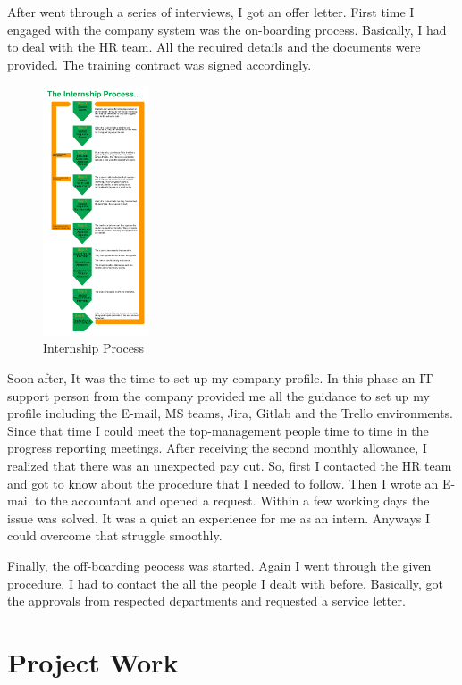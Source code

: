 \documentclass[twoside,12pt,times,onecolumn,a4paper]{report}
\begin{document}
\hspace{3em} After went through a series of interviews, I got an offer letter. First time I engaged with the company system was the on-boarding process. Basically, I had to deal with the HR team. All the required details and the documents were provided. The training contract was signed accordingly.

\begin{figure}
    \centering
    \includegraphics[width=0.28\textwidth]{intern}
    \caption{Internship Process}
\end{figure}

 Soon after, It was the time to set up my company profile. In this phase an IT support person from the company provided me all the guidance to set up my profile including the E-mail, MS teams, Jira, Gitlab and the Trello environments. Since that time I could meet the top-management people time to time in the progress reporting meetings. After receiving the second monthly allowance, I realized that there was an unexpected pay cut. So, first I contacted the HR team and got to know about the procedure that I needed to follow. Then I wrote an E-mail to the accountant and opened a request. Within a few working days the issue was solved. It was a quiet an experience for me as an intern. Anyways I could overcome that struggle smoothly. 

Finally, the off-boarding peocess was started. Again I went through the given procedure. I had to contact the all the people I dealt with before. Basically, got the approvals from respected departments and requested a service letter. 


\chapter{Project Work}
\end{document}
